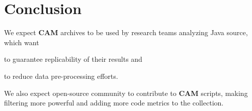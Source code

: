 \documentclass[11pt,sigplan,nonacm]{acmart}
\newcommand\cam{{\sffamily\bfseries CAM}}
\begin{document}
\section{Conclusion}

We expect \cam{} archives to be used by research teams analyzing Java source, which want
\begin{inparaenum}[(a)]
\item to guarantee replicability of their results
and
\item to reduce data pre-processing efforts.
\end{inparaenum}
We also expect open-source community to contribute to \cam{} scripts, making filtering more powerful and adding more code metrics to the collection.



\end{document}
